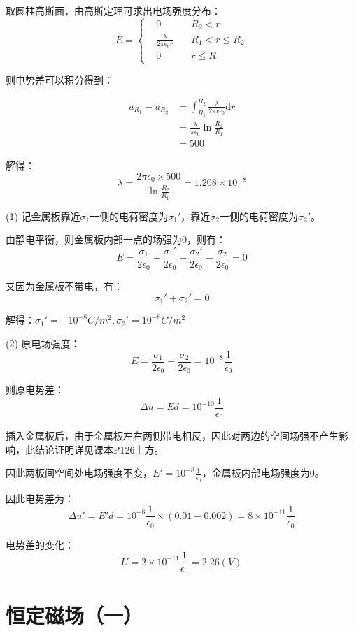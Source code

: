 \documentclass[b5paper,opensource,sourcefont,parskip]{qyxf-book}
\newcommand{\di}[1]{\mathrm{d}#1}
\begin{document}

\solve 取圆柱高斯面，由高斯定理可求出电场强度分布：
\begin{equation}
E=\left\{
\begin{aligned}
&0\quad &R_2<r\\
&\frac{\lambda}{2\pi\epsilon_0 r}\quad &R_1<r\leqslant R_2\\
&0	&r\leqslant R_1
\end{aligned}
\right.
\end{equation}

则电势差可以积分得到：

\begin{align*}
u_{R_1}-u_{R_2}&=\int_{R_1}^{R_2} \frac{\lambda}{2\pi r\epsilon_0} \di{r}\\
&=\frac{\lambda}{\pi\epsilon_0}\ln\frac{R_2}{R_1}\\
&=500
\end{align*}


解得：
\[\lambda=\frac{2\pi\epsilon_0\times 500}{\ln\frac{R_2}{R_1}}=1.208\times 10^{-8}\]


\solve 
(1) 记金属板靠近$ \sigma_1 $一侧的电荷密度为$ \sigma_1' $，靠近$ \sigma_2 $一侧的电荷密度为$ \sigma_2' $。

由静电平衡，则金属板内部一点的场强为$ 0 $，则有：
\[E=\frac{\sigma_1}{2\epsilon_0}+\frac{\sigma_1'}{2\epsilon_0}-\frac{\sigma_2'}{2\epsilon_0}-\frac{\sigma_2}{2\epsilon_0}=0\]

又因为金属板不带电，有：
\[\sigma_1'+\sigma_2'=0\]

解得：$\sigma_1'=-10^{-8}C/m^2,\sigma_2'=10^{-8}C/m^2$

(2) 原电场强度：
\[E=\frac{\sigma_1}{2\epsilon_0}-\frac{\sigma_2}{2\epsilon_0}=10^{-8}\frac{1}{\epsilon_0}\]

则原电势差：
\[\Delta u=Ed=10^{-10}\frac{1}{\epsilon_0}\]

插入金属板后，由于金属板左右两侧带电相反，因此对两边的空间场强不产生影响，此结论证明详见课本P126上方。

因此两板间空间处电场强度不变，$ E'=10^{-8}\frac{1}{\epsilon_0} $，金属板内部电场强度为$ 0 $。

因此电势差为：
\[\Delta u'=E'd=10^{-8}\frac{1}{\epsilon_0}\times(0.01-0.002)=8\times 10^{-11}\frac{1}{\epsilon_0}\]

电势差的变化：
\[U=2\times10^{-11}\frac{1}{\epsilon_0}=2.26(V)\]

\chapter{恒定磁场（一）}
\end{document}
